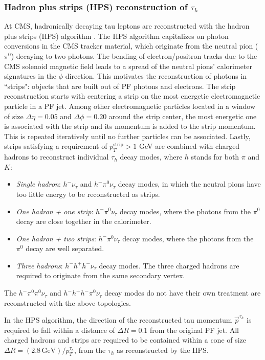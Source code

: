 \subsubsection{Hadron plus strips (HPS) reconstruction of \texorpdfstring{$\tau_{h}$}{tauh}}
At CMS, hadronically decaying tau leptons are reconstructed with the hadron plus strips (HPS) algorithm \citep{CMS-TAU-14-001} \cite{2012-JINST-7-P01001}. The HPS algorithm capitalizes on photon conversions in the CMS tracker material, which originate from the neutral pion ($\pi^0$) decaying to two photons. The bending of electron/positron tracks due to the CMS solenoid magnetic field leads to a spread of the neutral pions' calorimeter signatures in the $\phi$ direction. This motivates the reconstruction of photons in ``strips": objects that are built out of PF photons and electrons. The strip reconstruction starts with centering a strip on the most energetic electromagnetic particle in a PF jet. Among other electromagnetic particles located in a window of size $\Delta \eta = 0.05$ and $\Delta \phi = 0.20$ around the strip center, the most energetic one is associated with the strip and its momentum is added to the strip momentum. This is repeated iteratively until no further particles can be associated. Lastly, strips satisfying a requirement of $p_{T}^{\text{strip}} > 1$ GeV are combined with charged hadrons to reconstruct individual $\tau_{h}$ decay modes, where $h$ stands for both $\pi$ and $K$:
\begin{itemize}
    \item \textit{Single hadron}: $h^- \nu_{\tau}$ and $h^- \pi^0 \nu_{\tau}$ decay modes, in which the neutral pions have too little energy to be reconstructed as strips.
    \item \textit{One hadron + one strip}: $h^- \pi^0 \nu_{\tau}$ decay modes, where the photons from the $\pi^0$ decay are close together in the calorimeter.
    \item \textit{One hadron + two strips}: $h^- \pi^0 \nu_{\tau}$ decay modes, where the photons from the $\pi^0$ decay are well separated. 
    \item \textit{Three hadrons}: $h^- h^+ h^- \nu_{\tau}$ decay modes. The three charged hadrons are required to originate from the same secondary vertex.
\end{itemize}
The $h^- \pi^0 \pi^0 \nu_{\tau}$ and $h^- h^+ h^- \pi^0 \nu_{\tau}$ decay modes do not have their own treatment are reconstructed with the above topologies. 

In the HPS algorithm, the direction of the reconstructed tau momentum $\vec{p}^{\tau_{h}}$ is required to fall within a distance of $\Delta R = 0.1$ from the original PF jet. All charged hadrons and strips are required to be contained within a cone of size $\Delta R = (2.8 \,\text{GeV})/p_{T}^{\tau_{h}}$, from the $\tau_{h}$ as reconstructed by the HPS. 

